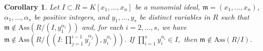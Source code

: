 \documentclass[11pt]{amsart}
\newtheorem{corollary}[theorem]{Corollary}
\begin{document}





\begin{corollary}    \label{Cor.maximal-ideal.2}
Let $I\subset R=K[x_1, \ldots, x_n]$ be a monomial ideal, $\mathfrak{m}=(x_1, \ldots, x_n)$,  $\alpha_1, \ldots, \alpha_s$ be positive integers, and  $y_1, \ldots, y_s$ be distinct variables in $R$  such that   $\mathfrak{m}\notin \mathrm{Ass}(R/(I,  y_{1}^{\alpha_1}))$   and,   for each  $i=2, \ldots, s$, we have   
$\mathfrak{m}\notin \mathrm{Ass}(R/((I:\prod_{j=1}^{i-1} y_j^{\alpha_j}), y_{i}^{\alpha_{i}}))$.  
If  $\prod_{i=1}^{s}y_i^{\alpha_i} \in I,$  then $\mathfrak{m}\notin  \mathrm{Ass}(R/I)$. 
\end{corollary} 


\end{document}
